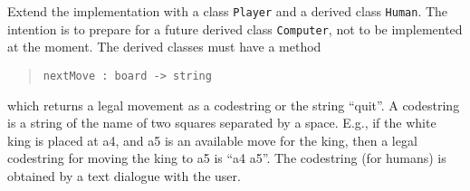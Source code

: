 Extend the implementation with a class \lstinline{Player} and a derived class \lstinline{Human}. The intention is to prepare for a future derived class \lstinline{Computer}, not to be implemented at the moment. The derived classes must have a method
\begin{quote}
\lstinline{nextMove : board -> string}
\end{quote}
which returns a legal movement as a codestring or the string ``quit''.  A codestring is a string of the name of two squares separated by a space. E.g., if the white king is placed at a4, and a5 is an available move for the king, then a legal codestring for moving the king to a5 is ``a4 a5''. The codestring (for humans) is obtained by a text dialogue with the user.
